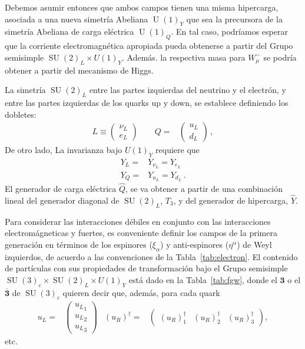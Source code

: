 \begin{frame}
Debemos asumir entonces que ambos campos tienen una misma hipercarga,
asociada a una nueva simetría Abeliana $\operatorname{U}(1)_Y$ que sea la precursora de la simetría Abeliana de carga eléctrica $\operatorname{U}(1)_Q$. En tal caso, podríamos esperar que
la corriente electromagnética apropiada pueda obtenerse a partir del
Grupo semisimple $\operatorname{SU}(2)_L\times U(1)_Y$. Además. la respectiva masa para $W_{\mu}^{-}$
se podría obtener a partir del mecanismo de Higgs.

La simetría $\operatorname{SU}(2)_L$ entre las partes izquierdas del neutrino y el electrón, y entre las partes izquierdas de los quarks up y down, se establece  definiendo los dobletes:
  \begin{align}
    L\equiv\begin{pmatrix}
      \nu_L\\
      e_L      
    \end{pmatrix}\qquad   Q=&\begin{pmatrix}
    u_L\\
    d_L
  \end{pmatrix}\,,
  \end{align}
De otro lado, La invarianza bajo $U(1)_Y$ requiere que
\begin{align}
  Y_L=&Y_{\nu_L}=Y_{e_L}\nonumber\\
  Y_Q=&Y_{u_L}=Y_{d_L}\,.
\end{align}
El generador de carga eléctrica $\widehat{Q}$, se va obtener a partir de una combinación lineal del generador diagonal de $\operatorname{SU}(2)_L$, $T_3$, y del generador de hipercarga, $\widehat{Y}$.

Para considerar las interacciones débiles en conjunto con las interacciones electromágneticas y fuertes, es conveniente definir los campos de la primera generación en términos de los espinores ($\xi_{\alpha}$) y anti-espinores ($\eta^{\alpha}$) de Weyl izquierdos, de acuerdo a las convenciones de la Tabla~\ref{tab:electron}. El contenido de partículas con sus propiedades de transformación bajo el Grupo semisimple $\operatorname{SU}(3)_c\times \operatorname{SU}(2)_L\times U(1)_Y$ está dado en la Tabla~\ref{tab:fgw}, donde el $\mathbf{3}$ o el $\overline{\mathbf{3}}$ de $\operatorname{SU}(3)_c$ quieren decir que, además, para cada quark
\begin{align}
u_L=&
\begin{pmatrix}
  {u_{L}}_1\\
  {u_{L}}_2\\
  {u_{L}}_3
\end{pmatrix}&
  \left( u_R \right)^{\dagger}=&
  \begin{pmatrix}
    \left( u_R \right)^{\dagger}_1&
        \left( u_R \right)^{\dagger}_2&    \left( u_R \right)^{\dagger}_3
  \end{pmatrix},
\end{align}
etc.




\end{frame}
